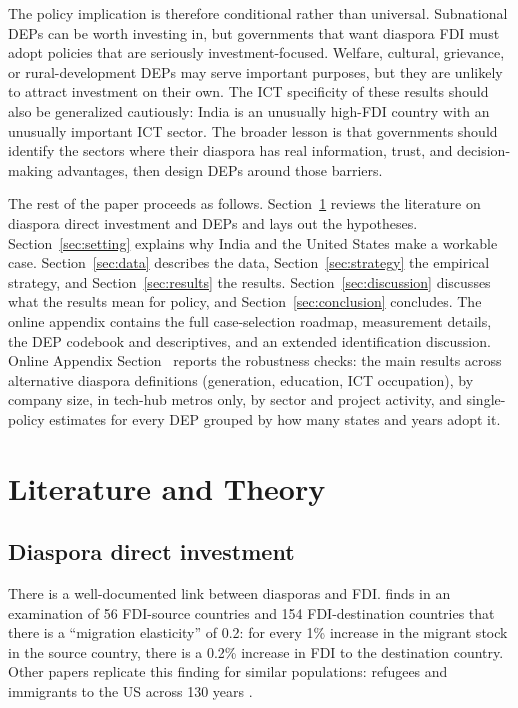 \documentclass[12pt]{article}
\begin{document}
The policy implication is therefore conditional rather than universal. Subnational DEPs can be worth investing in, but governments that want diaspora FDI must adopt policies that are seriously investment-focused. Welfare, cultural, grievance, or rural-development DEPs may serve important purposes, but they are unlikely to attract investment on their own. The ICT specificity of these results should also be generalized cautiously: India is an unusually high-FDI country with an unusually important ICT sector. The broader lesson is that governments should identify the sectors where their diaspora has real information, trust, and decision-making advantages, then design DEPs around those barriers.

The rest of the paper proceeds as follows. Section~\ref{sec:lit} reviews the literature on diaspora direct investment and DEPs and lays out the hypotheses. Section~\ref{sec:setting} explains why India and the United States make a workable case. Section~\ref{sec:data} describes the data, Section~\ref{sec:strategy} the empirical strategy, and Section~\ref{sec:results} the results. Section~\ref{sec:discussion} discusses what the results mean for policy, and Section~\ref{sec:conclusion} concludes. The online appendix contains the full case-selection roadmap, measurement details, the DEP codebook and descriptives, and an extended identification discussion. Online Appendix Section~ reports the robustness checks: the main results across alternative diaspora definitions (generation, education, ICT occupation), by company size, in tech-hub metros only, by sector and project activity, and single-policy estimates for every DEP grouped by how many states and years adopt it.

\section{Literature and Theory} \label{sec:lit}

\subsection{Diaspora direct investment}

There is a well-documented link between diasporas and FDI. \citet{leblang_familiarity_2010} finds in an examination of 56 FDI-source countries and 154 FDI-destination countries that there is a ``migration elasticity'' of 0.2: for every 1\% increase in the migrant stock in the source country, there is a 0.2\% increase in FDI to the destination country. Other papers replicate this finding for similar populations: refugees and immigrants to the US across 130 years \citep{mayda_refugees_2022, burchardi_migrants_2019}.
\end{document}
